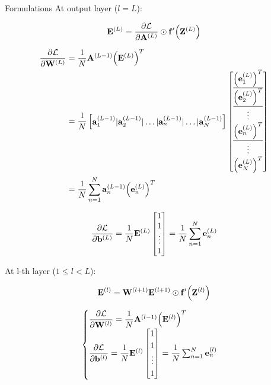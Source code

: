 \documentclass[10pt]{beamer}
\theoremstyle{remark}
\theoremstyle{definition}
\begin{document}
\begin{frame}[allowframebreaks]{Formulations}
	At output layer ($l=L$):

	\begin{equation}
		\bold{E}^{(L)}=\dfrac{\partial \mathcal{L}}{\partial \bold{A}^{(L)}} \odot \bold{f}^{\prime}\Big( \bold{Z}^{(L)} \Big)
	\end{equation}

	\begin{equation}
		\begin{aligned}
			\dfrac{\partial \mathcal{L}}{\partial \bold{W}^{(L)}}&=\dfrac{1}{N}\bold{A}^{(L-1)} \Big(\bold{E}^{(L)}\Big)^T\\&=\dfrac{1}{N}\begin{bmatrix} \bold{a}_1^{(L-1)} \vert \bold{a}_2^{(L-1)} \vert \dots \vert \bold{a}_n^{(L-1)} \vert \dots \vert \bold{a}_N^{(L-1)} \end{bmatrix}\begin{bmatrix} \underline{\Big(\bold{e}_1^{(L)}\Big)^T} \\ \underline{\Big(\bold{e}_2^{(L)}\Big)^T} \\ \vdots \\ \underline{\Big(\bold{e}_n^{(L)}\Big)^T} \\ \vdots \\ \Big(\bold{e}_N^{(L)}\Big)^T \end{bmatrix}\\&=\dfrac{1}{N}\sum_{n=1}^{N} \bold{a}_n^{(L-1)}\Big(\bold{e}_n^{(L)}\Big)^T
		\end{aligned}
	\end{equation}

	\begin{equation}
		\dfrac{\partial \mathcal{L}}{\partial \bold{b}^{(L)}}=\dfrac{1}{N}\bold{E}^{(L)}\begin{bmatrix} 1 \\ 1 \\ \vdots \\ 1 \end{bmatrix}=\dfrac{1}{N}\sum_{n=1}^{N}\bold{e}_n^{(L)}
	\end{equation}

	At l-th layer ($1 \leq l < L$):

	\begin{equation}
		\bold{E}^{(l)}=\bold{W}^{(l+1)}\bold{E}^{(l+1)}\odot \bold{f}^{\prime}\Big( \bold{Z}^{(l)} \Big)
	\end{equation}

	\begin{equation}
		\begin{cases}\dfrac{\partial \mathcal{L}}{\partial \bold{W}^{(l)}}=\dfrac{1}{N}\bold{A}^{(l-1)}\Big(\bold{E}^{(l)}\Big)^T \\ \dfrac{\partial \mathcal{L}}{\partial \bold{b}^{(l)}}=\dfrac{1}{N}\bold{E}^{(l)}\begin{bmatrix} 1 \\ 1 \\ \vdots \\ 1 \end{bmatrix}=\dfrac{1}{N}\sum_{n=1}^{N}\bold{e}_n^{(l)} \end{cases}
	\end{equation}


\end{frame}
\end{document}
